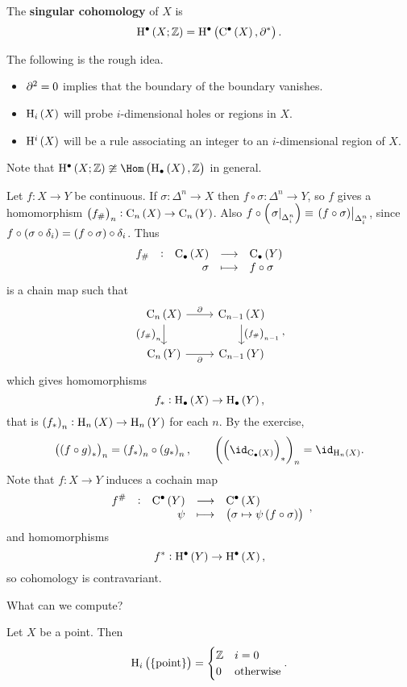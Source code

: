 \begin{definition*}
The \textbf{singular cohomology} of $ X $ is
$$ \H^\bullet\br{X; \ZZ} = \H^\bullet\br{\C^\bullet\br{X}, \da^*}. $$
\end{definition*}

The following is the rough idea.
\begin{itemize}
\item $ \partial^2 = 0 $ implies that the boundary of the boundary vanishes.
\item $ \H_i\br{X} $ will probe $ i $-dimensional holes or regions in $ X $.
\item $ \H^i\br{X} $ will be a rule associating an integer to an $ i $-dimensional region of $ X $.
\end{itemize}
Note that $ \H^\bullet\br{X; \ZZ} \ncong \Hom\br{\H_\bullet\br{X}, \ZZ} $ in general.


\begin{remark*}
Let $ f : X \to Y $ be continuous. If $ \sigma : \Delta^n \to X $ then $ f \circ \sigma : \Delta^n \to Y $, so $ f $ gives a homomorphism $ \br{f_\#}_n : \C_n\br{X} \to \C_n\br{Y} $. Also $ f \circ \br{\eval{\sigma}_{\Delta_i^n}} \equiv \eval{\br{f \circ \sigma}}_{\Delta_i^n} $, since $ f \circ \br{\sigma \circ \delta_i} = \br{f \circ \sigma} \circ \delta_i $. Thus
$$ \function[f_\#]{\C_\bullet\br{X}}{\C_\bullet\br{Y}}{\sigma}{f \circ \sigma} $$
is a chain map such that
$$
\begin{tikzcd}
\C_n\br{X} \arrow{r}{\da} \arrow{d}[swap]{\br{f_\#}_n} & \C_{n - 1}\br{X} \arrow{d}{\br{f_\#}_{n - 1}} \\
\C_n\br{Y} \arrow{r}[swap]{\da} & \C_{n - 1}\br{Y}
\end{tikzcd},
$$
which gives homomorphisms
$$ f_* : \H_\bullet\br{X} \to \H_\bullet\br{Y}, $$
that is $ \br{f_*}_n : \H_n\br{X} \to \H_n\br{Y} $ for each $ n $. By the exercise,
$$ \br{\br{f \circ g}_*}_n = \br{f_*}_n \circ \br{g_*}_n, \qquad \br{\br{\id_{\C_\bullet\br{X}}}_*}_n = \id_{\H_n\br{X}}. $$
Note that $ f : X \to Y $ induces a cochain map
$$ \function[f^\#]{\C^\bullet\br{Y}}{\C^\bullet\br{X}}{\psi}{\br{\sigma \mapsto \psi\br{f \circ \sigma}}}, $$
and homomorphisms
$$ f^* : \H^\bullet\br{Y} \to \H^\bullet\br{X}, $$
so cohomology is contravariant.
\end{remark*}

\pagebreak

What can we compute?

\begin{lemma}
Let $ X $ be a point. Then
$$ \H_i\br{\pt} =
\begin{cases}
\ZZ & i = 0 \\
0 & \text{otherwise}
\end{cases}.
$$
\end{lemma}

